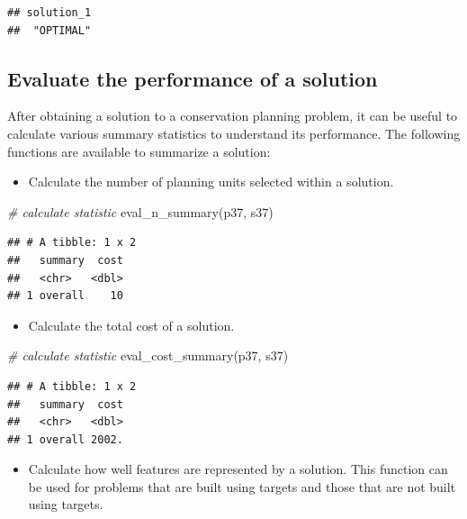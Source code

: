 \documentclass[
  12pt,
]{book}
\newenvironment{Shaded}{\begin{snugshade}}{\end{snugshade}}
\newcommand{\CommentTok}[1]{\textcolor[rgb]{0.56,0.35,0.01}{\textit{#1}}}
\newcommand{\FunctionTok}[1]{\textcolor[rgb]{0.00,0.00,0.00}{#1}}
\newcommand{\NormalTok}[1]{#1}
\providecommand{\tightlist}{%
  \setlength{\itemsep}{0pt}\setlength{\parskip}{0pt}}
\begin{document}
\begin{verbatim}
## solution_1 
##  "OPTIMAL"
\end{verbatim}

\hypertarget{evaluate-the-performance-of-a-solution}{%
\subsection{Evaluate the performance of a solution}\label{evaluate-the-performance-of-a-solution}}

After obtaining a solution to a conservation planning problem, it can be useful to calculate various summary statistics to understand its performance. The following functions are available to summarize a solution:

\begin{itemize}
\tightlist
\item
  Calculate the number of planning units selected within a solution.
\end{itemize}

\begin{Shaded}
\begin{Highlighting}[]
\CommentTok{\# calculate statistic}
\FunctionTok{eval\_n\_summary}\NormalTok{(p37, s37)}
\end{Highlighting}
\end{Shaded}

\begin{verbatim}
## # A tibble: 1 x 2
##   summary  cost
##   <chr>   <dbl>
## 1 overall    10
\end{verbatim}

\begin{itemize}
\tightlist
\item
  Calculate the total cost of a solution.
\end{itemize}

\begin{Shaded}
\begin{Highlighting}[]
\CommentTok{\# calculate statistic}
\FunctionTok{eval\_cost\_summary}\NormalTok{(p37, s37)}
\end{Highlighting}
\end{Shaded}

\begin{verbatim}
## # A tibble: 1 x 2
##   summary  cost
##   <chr>   <dbl>
## 1 overall 2002.
\end{verbatim}

\begin{itemize}
\tightlist
\item
  Calculate how well features are represented by a solution. This function can be used for problems that are built using targets and those that are not built using targets.
\end{itemize}
\end{document}
